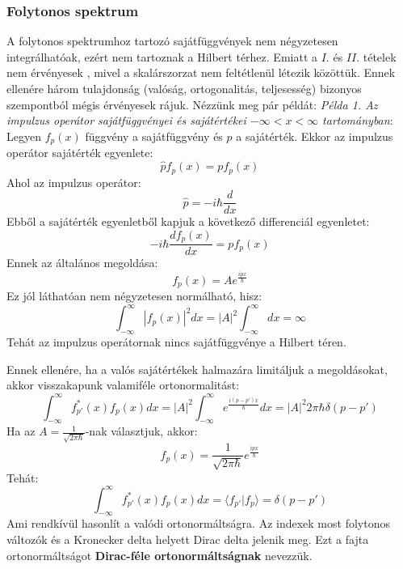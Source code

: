 \documentclass[../main.tex]{subfiles}
\begin{document}
\subsubsection*{Folytonos spektrum}
A folytonos spektrumhoz tartozó sajátfüggvények nem négyzetesen integrálhatóak, ezért nem tartoznak a Hilbert térhez. Emiatt a $I.$ és $II.$ tételek nem érvényesek , mivel a skalárszorzat nem feltétlenül létezik közöttük.
Ennek ellenére három tulajdonság (valóság, ortogonalitás, teljesesség) bizonyos szempontból mégis érvényesek rájuk. Nézzünk meg pár példát:
\newline
\newline
\textit{Példa 1. Az impulzus operátor sajátfüggvényei és sajátértékei $-\infty < x < \infty$ tartományban}:
\newline
\newline
Legyen $f_p(x)$ függvény a sajátfüggvény és $p$ a sajátérték. Ekkor az impulzus operátor sajátérték egyenlete:
\begin{equation}
    \hat{p} f_p(x) = p f_p(x)
\end{equation}
Ahol az impulzus operátor:
\begin{equation}
    \hat{p} = -i\hbar \frac{d}{dx}
\end{equation}
Ebből a sajátérték egyenletből kapjuk a következő differenciál egyenletet:
\begin{equation}
    -i\hbar \frac{d f_p(x)}{dx} = p f_p(x)
\end{equation}
Ennek az általános megoldása:
\begin{equation}
    f_p(x) = A e^{\frac{i p x}{\hbar}}
\end{equation}
Ez jól láthatóan nem négyzetesen normálható, hisz:
\begin{equation}
    \int_{-\infty}^{\infty} |f_p(x)|^2 dx = |A|^2 \int_{-\infty}^{\infty} dx = \infty
\end{equation}
Tehát az impulzus operátornak nincs sajátfüggvénye a Hilbert téren. 

Ennek ellenére, ha a valós sajátértékek halmazára limitáljuk a megoldásokat, akkor visszakapunk valamiféle ortonormalitást:
\begin{equation}
    \int_{-\infty}^{\infty} f_{p'}^*(x) f_p(x) dx = |A|^2 \int_{-\infty}^{\infty} e^{\frac{i (p - p') x}{\hbar}} dx = |A|^2 2\pi \hbar \delta(p - p')
\end{equation}
Ha az $A = \frac{1}{\sqrt{2\pi \hbar}}$-nak választjuk, akkor:
\begin{equation}
    f_p (x) = \frac{1}{\sqrt{2\pi \hbar}} e^{\frac{i p x}{\hbar}}
\end{equation}
Tehát:
\begin{equation}
    \int_{-\infty}^{\infty} f_{p'}^*(x) f_p(x) dx = \langle f_{p'} | f_p \rangle = \delta(p - p')
\end{equation}
Ami rendkívül hasonlít a valódi ortonormáltságra. Az indexek most folytonos változók és a Kronecker delta helyett Dirac delta jelenik meg. Ezt a fajta ortonormáltságot \textbf{Dirac-féle ortonormáltságnak} nevezzük.
\end{document}
